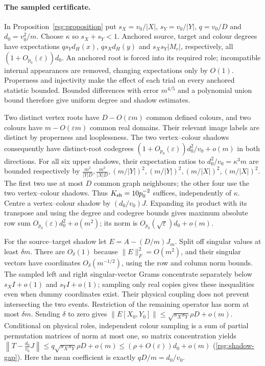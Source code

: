 \paragraph{The sampled certificate.}
\label{lem:shadows}\label{lem:gram}\label{sg:lem:gram}
In Proposition~\ref{rsg:proposition} put $s_X=v_0/|X|$, $s_Y=v_0/|Y|$, $q=v_0/D$ and $d_0=v_0^2/m$.  Choose $\kappa$ so $s_X+s_Y<1$. Anchored source, target and colour degrees have expectations $qs_Yd_H(x)$, $qs_Xd_H(y)$ and $s_Xs_Y|M_c|$, respectively, all $(1+O_{p_0}(\varepsilon))d_0$.  An anchored root is forced into its required role; incompatible internal appearances are removed,
changing expectations only by $O(1)$.  Properness and injectivity make the effect of each trial on every anchored statistic bounded.
Bounded differences with error $m^{4/5}$ and a polynomial union bound therefore give uniform degree and shadow estimates.

Two distinct vertex roots have $D-O(\varepsilon{}m)$ common defined colours, and two colours have $m-O(\varepsilon{}m)$ common real domains.  Their relevant image labels are distinct by properness
and looplessness.  The two vertex--colour shadows consequently
have distinct-root codegrees $(1+O_{p_0}(\varepsilon))d_0^2/v_0+o(m)$ in both directions. For all six upper shadows, their expectation ratios to $d_0^2/v_0=\kappa^3m$ are bounded respectively by $\frac{m^2}{|Y|D},\frac{m^2}{|X|D},(m/|Y|)^2,(m/|Y|)^2,(m/|X|)^2,(m/|X|)^2$. The first two use at most $D$ common graph neighbours; the other four use the two vertex--colour shadows.  Thus $K_{\rm{}sh}=10p_0^{-2}$ suffices, independently of $\kappa$. Centre a vertex--colour shadow by $(d_0/v_0)J$.  Expanding its product with its transpose and using the degree and codegree bounds
gives maximum absolute row sum $O_{p_0}(\varepsilon)d_0^2+o(m^2)$; its norm is $O_{p_0}(\sqrt\varepsilon)d_0+o(m)$.

For the source--target shadow let $E=A-(D/m)J_m$.  Split off singular values at least $\delta{}m$.  There are $O_\delta(1)$ because $\|E\|_F^2=O(m^2)$, and their singular vectors have coordinates $O_\delta(m^{-1/2})$, using the row and column norm bounds.  The sampled left and right singular-vector Grams concentrate
separately below $s_XI+o(1)$ and $s_YI+o(1)$; sampling only real copies gives these inequalities even when dummy coordinates exist.
Their physical coupling does not prevent intersecting the two
events.  Restriction of the remaining operator has norm at most $\delta{}m$.  Sending $\delta$ to zero gives $\|E[X_0,Y_0]\|\le\sqrt{s_Xs_Y}\rho{}D+o(m)$. Conditional on physical roles, independent colour sampling is a sum
of partial permutation matrices of norm at most one, so matrix
concentration yields \label{rsg:shadow-gap}$\left\|T-\frac{d_0}{v_0}J\right\|\le{}q\sqrt{s_Xs_Y}\rho{}D+o(m)\le(\rho+O(\varepsilon))d_0+o(m)$ \textup{(\ref{rsg:shadow-gap})}. Here the mean coefficient is exactly $qD/m=d_0/v_0$.

